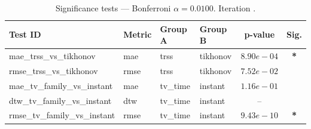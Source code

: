 ﻿%
\begin{table}[ht]
\centering
\caption[EEG reconstruction - Iteration it03]{Significance tests — Bonferroni $\alpha=0.0100$. Iteration .}
\label{tab:sig_it03_synthetic_beta}
\small
\begin{tabular}{llllcc}
\toprule
Test ID & Metric & Group A & Group B & p-value & Sig. \\
\midrule
mae\_trss\_vs\_tikhonov & mae & trss & tikhonov & $8.90e-04$ & \textbf{*} \\
rmse\_trss\_vs\_tikhonov & rmse & trss & tikhonov & $7.52e-02$ &  \\
mae\_tv\_family\_vs\_instant & mae & tv\_time & instant & $1.16e-01$ &  \\
dtw\_tv\_family\_vs\_instant & dtw & tv\_time & instant & -- &  \\
rmse\_tv\_family\_vs\_instant & rmse & tv\_time & instant & $9.43e-10$ & \textbf{*} \\
\bottomrule
\end{tabular}
\end{table}







